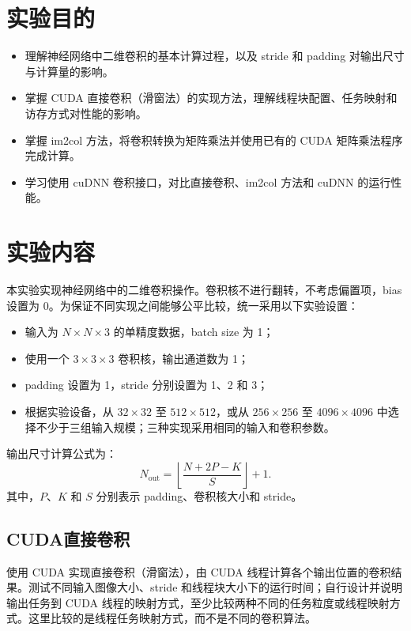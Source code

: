 \documentclass{SYSUReport}
\date{\today}
\begin{document}
\cover
\thispagestyle{empty}
\clearpage

\section{实验目的}
\begin{itemize}
    \item 理解神经网络中二维卷积的基本计算过程，以及 stride 和 padding 对输出尺寸与计算量的影响。
    \item 掌握 CUDA 直接卷积（滑窗法）的实现方法，理解线程块配置、任务映射和访存方式对性能的影响。
    \item 掌握 im2col 方法，将卷积转换为矩阵乘法并使用已有的 CUDA 矩阵乘法程序完成计算。
    \item 学习使用 cuDNN 卷积接口，对比直接卷积、im2col 方法和 cuDNN 的运行性能。
\end{itemize}

\section{实验内容}
本实验实现神经网络中的二维卷积操作。卷积核不进行翻转，不考虑偏置项，bias 设置为 0。为保证不同实现之间能够公平比较，统一采用以下实验设置：
\begin{itemize}
    \item 输入为 $N\times N\times3$ 的单精度数据，batch size 为 1；
    \item 使用一个 $3\times3\times3$ 卷积核，输出通道数为 1；
    \item padding 设置为 1，stride 分别设置为 1、2 和 3；
    \item 根据实验设备，从 $32\times32$ 至 $512\times512$，或从 $256\times256$ 至 $4096\times4096$ 中选择不少于三组输入规模；三种实现采用相同的输入和卷积参数。
\end{itemize}
输出尺寸计算公式为：
\begin{equation*}
N_{\mathrm{out}}
=
\left\lfloor
\frac{N+2P-K}{S}
\right\rfloor
+1.
\end{equation*}
其中，$P$、$K$ 和 $S$ 分别表示 padding、卷积核大小和 stride。

\subsection{CUDA直接卷积}
使用 CUDA 实现直接卷积（滑窗法），由 CUDA 线程计算各个输出位置的卷积结果。测试不同输入图像大小、stride 和线程块大小下的运行时间；自行设计并说明输出任务到 CUDA 线程的映射方式，至少比较两种不同的任务粒度或线程映射方式。这里比较的是线程任务映射方式，而不是不同的卷积算法。
\end{document}
